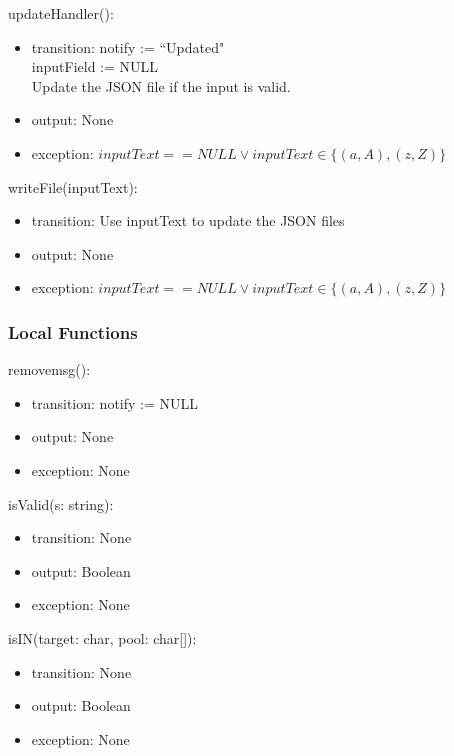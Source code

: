 \documentclass[12pt, titlepage]{article}
\begin{document}
\noindent updateHandler():
\begin{itemize}
\item transition: notify := ``Updated"\\
inputField := NULL\\
Update the JSON file if the input is valid.\\
\item output: None\\
\item exception: $inputText == NULL \lor inputText \in \{(a,A), (z,Z)\}$
\end{itemize}

\noindent writeFile(inputText):
\begin{itemize}
\item transition: Use inputText to update the JSON files\\
\item output: None\\
\item exception: $inputText == NULL \lor inputText \in \{(a,A), (z,Z)\}$
\end{itemize}


\subsubsection{Local Functions}
\noindent removemsg():
\begin{itemize}
\item transition: notify := NULL\\
\item output: None\\
\item exception: None\\
\end{itemize}

\noindent isValid(s: string):
\begin{itemize}
\item transition: None\\
\item output: Boolean\\
\item exception: None\\
\end{itemize}

\noindent isIN(target: char, pool: char[]):
\begin{itemize}
\item transition: None\\
\item output: Boolean\\
\item exception: None\\
\end{itemize}
\end{document}
